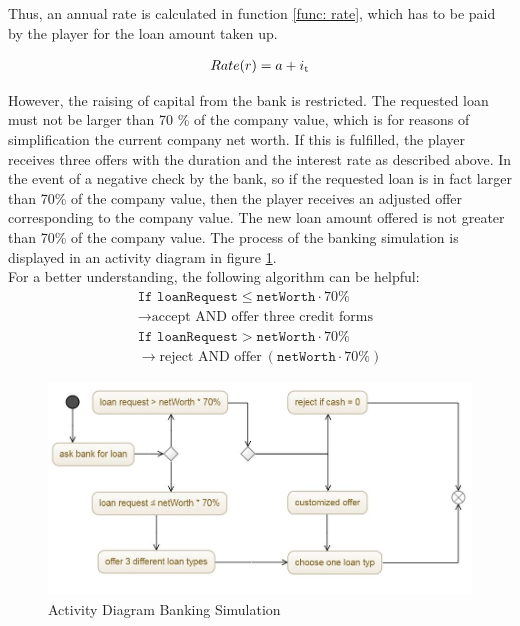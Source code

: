 Thus, an annual rate is calculated in function \ref{func: rate}, which has to be paid by the player for the loan amount taken up.

\begin{equation}
\label{func: rate}
\begin{aligned}
Rate (r)= a+ i\textsubscript{t}
\end{aligned}    
\end{equation}


However, the raising of capital from the bank is restricted.
The requested loan must not be larger than 70 \% of the company value, which is for reasons of simplification the current company net worth. If this is fulfilled, the player receives three offers with the duration and the interest rate as described above. In the event of a negative check by the bank, so if the requested loan is in fact larger than 70\% of the company value, then the player receives an adjusted offer corresponding to the company value. The new loan amount offered is not greater than 70\% of the company value. The process of the banking simulation is displayed in an activity diagram in figure \ref{jpg:banking}.\\
For a better understanding, the following algorithm can be helpful:
\begin{equation}
    \begin{aligned}
         \texttt{If loanRequest} \leq \texttt{netWorth} \cdot 70\% \\ \xrightarrow{} \text{accept AND offer three credit forms} \\
         \texttt{If loanRequest} > \texttt{netWorth} \cdot 70\% \\ \xrightarrow{} \text{reject AND offer} \ (\texttt{netWorth} \cdot 70\%)
    \end{aligned}    
\end{equation}

\begin{figure}
	\centering
	\includegraphics[width=12cm]{images/activity_diagram.JPG}
	\caption{Activity Diagram Banking Simulation}
	\label{jpg:banking}
\end{figure}

